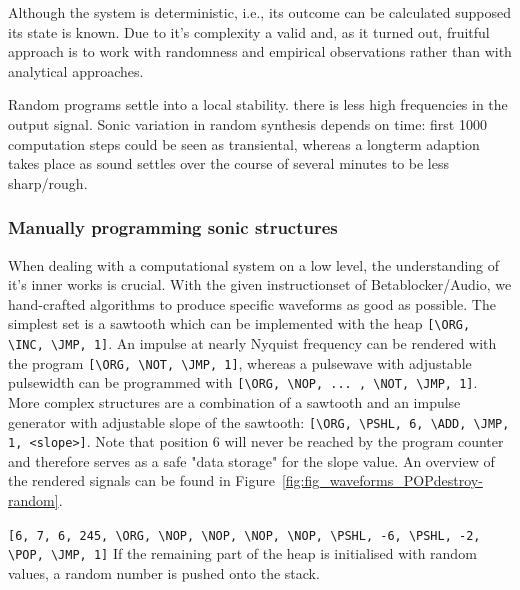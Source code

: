 \documentclass[letterpaper, 12pt]{article}
\begin{document}
Although the system is deterministic, i.e., its outcome can be calculated supposed its state is known.
Due to it's complexity a valid and, as it turned out, fruitful approach is to work with randomness and empirical observations rather than with analytical approaches.

Random programs settle into a local stability. there is less high frequencies in the output signal. 
Sonic variation in random synthesis depends on time: 
first 1000 computation steps could be seen as transiental, whereas a longterm adaption takes place as sound settles over the course of several minutes to be less sharp/rough.

\subsubsection{Manually programming sonic structures}
\label{sub:manual_programming_sonic_structures}

When dealing with a computational system on a low level, the understanding of it's inner works is crucial.
With the given instructionset of Betablocker/Audio, we hand-crafted algorithms to produce specific waveforms as good as possible.
The simplest set is a sawtooth which can be implemented with the heap \verb#[\ORG, \INC, \JMP, 1]#.
An impulse at nearly Nyquist frequency can be rendered with the program \verb#[\ORG, \NOT, \JMP, 1]#, whereas a pulsewave with adjustable pulsewidth can be programmed with \verb#[\ORG, \NOP, ... , \NOT, \JMP, 1]#.
More complex structures are a combination of a sawtooth and an impulse generator with adjustable slope of the sawtooth: \verb#[\ORG, \PSHL, 6, \ADD, \JMP, 1, <slope>]#. Note that position 6 will never be reached by the program counter and therefore serves as a safe "data storage" for the slope value.
An overview of the rendered signals can be found in Figure~\ref{fig:fig_waveforms_POPdestroy-random}.

\verb#[6, 7, 6, 245, \ORG, \NOP, \NOP, \NOP, \NOP, \PSHL, -6, \PSHL, -2, \POP, \JMP, 1]#
If the remaining part of the heap is initialised with random values, a random number is pushed onto the stack.
\end{document}
